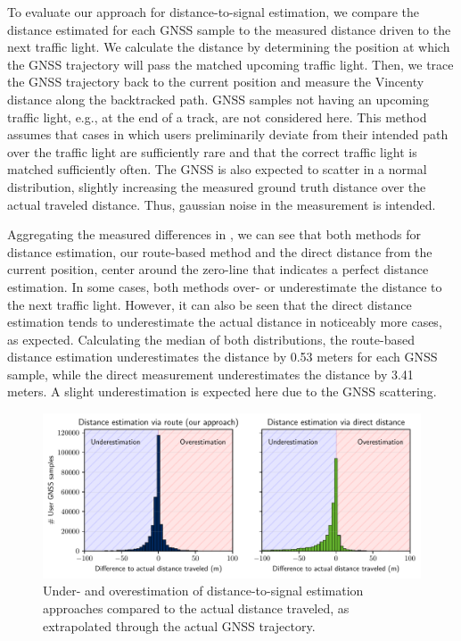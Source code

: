 To evaluate our approach for distance-to-signal estimation, we compare the distance estimated for each GNSS sample to the measured distance driven to the next traffic light. We calculate the distance by determining the position at which the GNSS trajectory will pass the matched upcoming traffic light. Then, we trace the GNSS trajectory back to the current position and measure the Vincenty distance along the backtracked path. GNSS samples not having an upcoming traffic light, e.g., at the end of a track, are not considered here. This method assumes that cases in which users preliminarily deviate from their intended path over the traffic light are sufficiently rare and that the correct traffic light is matched sufficiently often. The GNSS is also expected to scatter in a normal distribution, slightly increasing the measured ground truth distance over the actual traveled distance. Thus, gaussian noise in the measurement is intended.

Aggregating the measured differences in , we can see that both methods for distance estimation, our route-based method and the direct distance from the current position, center around the zero-line that indicates a perfect distance estimation. In some cases, both methods over- or underestimate the distance to the next traffic light. However, it can also be seen that the direct distance estimation tends to underestimate the actual distance in noticeably more cases, as expected. Calculating the median of both distributions, the route-based distance estimation underestimates the distance by 0.53 meters for each GNSS sample, while the direct measurement underestimates the distance by 3.41 meters. A slight underestimation is expected here due to the GNSS scattering.

\begin{figure}[t]
\centering 
\includegraphics[width=\linewidth]{images/routing-distance-distribution.pdf}
\caption{Under- and overestimation of distance-to-signal estimation approaches compared to the actual distance traveled, as extrapolated through the actual GNSS trajectory.}
\label{fig:routing-distance-distribution}
\end{figure}

